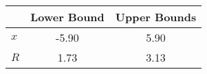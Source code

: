 \begin{tiny}\begin{tabular}{|l|c|c|}
\hline
&\textbf{Lower Bound}&\textbf{Upper Bounds}\\\hline
\textbf{$x$}&-5.90&5.90\\\hline
\textbf{$R$}&1.73&3.13\\\hline
\end{tabular}
\end{tiny}